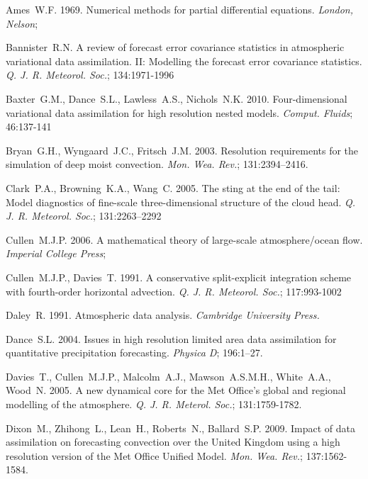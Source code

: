 \documentclass[times]{qjrms4}
\begin{document}
\begin{thebibliography}
%

Ames~W.F. 1969. Numerical methods for partial differential equations.
\emph{London, Nelson};   

Bannister~R.N. A review of forecast error covariance statistics in atmospheric variational data assimilation. II: Modelling the forecast error covariance statistics.
\emph{Q. J. R. Meteorol. Soc.}; 134:1971-1996

Baxter~G.M., Dance~S.L., Lawless~A.S., Nichols~N.K. 2010. Four-dimensional variational data
assimilation for high resolution nested models. 
\emph{Comput. Fluids}; 46:137-141

Bryan~G.H., Wyngaard~J.C., Fritsch~J.M. 2003. Resolution requirements for the
simulation of deep moist convection.
\emph{Mon. Wea. Rev.}; 131:2394–2416.

Clark~P.A., Browning~K.A.,  Wang~C. 2005. The sting at the end of the tail: Model diagnostics of fine-scale
three-dimensional structure of the cloud head.
\emph{Q. J. R. Meteorol. Soc.}; 131:2263–2292

Cullen~M.J.P. 2006. A mathematical theory of large-scale atmosphere/ocean flow.
\emph{Imperial College Press};   
 
Cullen~M.J.P., Davies~T. 1991. A conservative split-explicit integration scheme with fourth-order horizontal advection.
\emph{Q. J. R. Meteorol. Soc.}; 117:993-1002

Daley~R. 1991. Atmospheric data analysis.
\emph{Cambridge University Press.}

Dance~S.L. 2004. Issues in high resolution limited area data assimilation for quantitative
precipitation forecasting. 
\emph{Physica D}; 196:1–27.

Davies~T., Cullen~M.J.P., Malcolm~A.J., Mawson~A.S.M.H., White~A.A., Wood~N. 2005. A new dynamical core for the Met Office's global and regional modelling of the atmosphere.
\emph{Q. J. R. Meterol. Soc.}; 131:1759-1782.

Dixon~M., Zhihong~L., Lean~H., Roberts~N., Ballard~S.P. 2009. Impact of data assimilation on forecasting convection over the United Kingdom using a high resolution version of the Met Office Unified Model.
\emph{Mon. Wea. Rev.}; 137:1562-1584.


\end{thebibliography}
\end{document}
